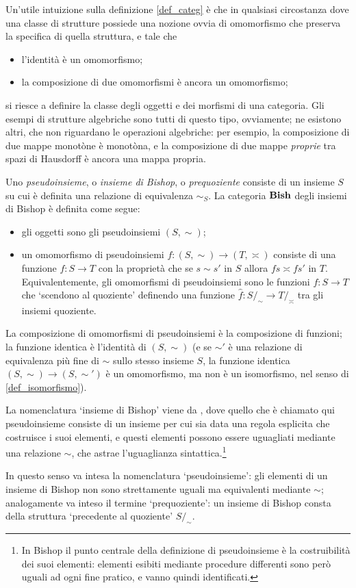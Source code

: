 Un'utile intuizione sulla definizione \ref{def_categ} è che in qualsiasi circostanza dove una classe di strutture possiede una nozione ovvia di omomorfismo che preserva la specifica di quella struttura, e tale che
\begin{itemize}
	\item l'identità è un omomorfismo;
	\item la composizione di due omomorfismi è ancora un omomorfismo;
\end{itemize}
si riesce a definire la classe degli oggetti e dei morfismi di una categoria. Gli esempi di strutture algebriche sono tutti di questo tipo, ovviamente; ne esistono altri, che non riguardano le operazioni algebriche: per esempio, la composizione di due mappe monotòne è monotòna, e la composizione di due mappe \emph{proprie} tra spazi di Hausdorff è ancora una mappa propria.
\begin{example}
	Uno \emph{pseudoinsieme}, o \emph{insieme di Bishop}, o \emph{prequoziente} consiste di un insieme $S$ su cui è definita una relazione di equivalenza $\sim_S$. La categoria $\mathbf{Bish}$ degli insiemi di Bishop è definita come segue: 
	\begin{itemize}
		\item gli oggetti sono gli pseudoinsiemi $(S,\sim)$;
		\item un omomorfismo di pseudoinsiemi $f : (S,\sim) \to (T,\asymp)$ consiste di una funzione $f : S\to T$ con la proprietà che se $s\sim s'$ in $S$ allora $fs\asymp fs'$ in $T$. Equivalentemente, gli omomorfismi di pseudoinsiemi sono le funzioni $f : S\to T$ che `scendono al quoziente' definendo una funzione $\hat f : S/_\sim \to T/_\asymp$ tra gli insiemi quoziente.
	\end{itemize}
	La composizione di omomorfismi di pseudoinsiemi è la composizione di funzioni; la funzione identica è l'identità di $(S,\sim)$ (e se $\sim'$ è una relazione di equivalenza più fine di $\sim$ sullo stesso insieme $S$, la funzione identica $(S,\sim) \to (S,\sim')$ è un omomorfismo, ma non è un isomorfismo, nel senso di \ref{def_isomorfismo}).
\end{example}
\begin{remark}
  La nomenclatura `insieme di Bishop' viene da \cite{Bishop1985}, dove quello che è chiamato qui pseudoinsieme consiste di un insieme per cui sia data una regola esplicita che costruisce i suoi elementi, e questi elementi possono essere uguagliati mediante una relazione $\sim$, che astrae l'uguaglianza sintattica.\footnote{In Bishop il punto centrale della definizione di pseudoinsieme è la costruibilità dei suoi elementi: elementi esibiti mediante procedure differenti sono però uguali ad ogni fine pratico, e vanno quindi identificati.}

  In questo senso va intesa la nomenclatura `pseudoinsieme': gli elementi di un insieme di Bishop non sono strettamente uguali ma equivalenti mediante $\sim$; analogamente va inteso il termine `prequoziente': un insieme di Bishop consta della struttura `precedente al quoziente' $S/_\sim$.
\end{remark}
